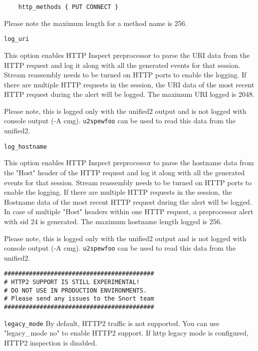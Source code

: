 \documentclass[english]{report}
\newcounter{slistnum}
\newenvironment{slist}
{ \begin{list}{ {\bf \arabic{slistnum}.} }{\usecounter{slistnum} } }
{ \end{list} }
\newenvironment{note}{
\samepage
    \vspace{10pt}{\textsf{
        {\hspace{7pt}\Huge{$\triangle$\hspace{-12.5pt}{\Large{$^!$}}}}\hspace{5pt}
        {\Large{NOTE}}
    }
    }
   \begin{center}
    \par\vspace{-17pt}

    \begin{lrbox}{\savepar}
    \begin{minipage}[r]{6in}
}
{
    \end{minipage}
    \end{lrbox}
    \fbox{
        \usebox{
            \savepar
	}
    }
    \par\vskip10pt
    \end{center}
}
\newenvironment{note}{
        \begin{rawhtml}
        <p><table border="1"><tr><td><b>
        Note:&nbsp;&nbsp;</b>
        \end{rawhtml}
}{
        \begin{rawhtml}
        </b></td></tr></table></p>
        \end{rawhtml}
}
\begin{document}
\begin{slist}
\begin{verbatim}
    http_methods { PUT CONNECT }
\end{verbatim}

\begin{note}

Please note the maximum length for a method name is 256.

\end{note}

\item \texttt{log\_uri}

This option enables HTTP Inspect preprocessor to parse the URI data from the
HTTP request and log it along with all the generated events for that session.
Stream reassembly needs to be turned on HTTP ports to enable the logging.
If there are multiple HTTP requests in the session, the URI data of the most recent
HTTP request during the alert will be logged. The maximum URI logged is 2048.

\begin{note}

Please note, this is logged only with the unified2 output and is not logged
with console output (-A cmg). \texttt{u2spewfoo} can be used to read this data from
the unified2.

\end{note}

\item \texttt{log\_hostname}

This option enables HTTP Inspect preprocessor to parse the hostname data from the
"Host" header of the HTTP request and log it along with all the generated events
for that session. Stream reassembly needs to be turned on HTTP ports to enable
the logging. If there are multiple HTTP requests in the session, the Hostname data
of the most recent HTTP request during the alert will be logged. In case of
multiple "Host" headers within one HTTP request, a preprocessor alert with sid 24 is
generated. The maximum hostname length logged is 256.

\begin{note}

Please note, this is logged only with the unified2 output and is not logged
with console output (-A cmg). \texttt{u2spewfoo} can be used to read this data from
the unified2.

\end{note}

\begin{verbatim}
##########################################
# HTTP2 SUPPORT IS STILL EXPERIMENTAL!
# DO NOT USE IN PRODUCTION ENVIRONMENTS.
# Please send any issues to the Snort team
##########################################
\end{verbatim}

\item \texttt{legacy\_mode}
By default, HTTP2 traffic is not supported. You can use "legacy\_mode no"
to enable HTTP2 support.
If http legacy mode is configured, HTTP2 inspection is disabled.

\end{slist}
\end{document}
